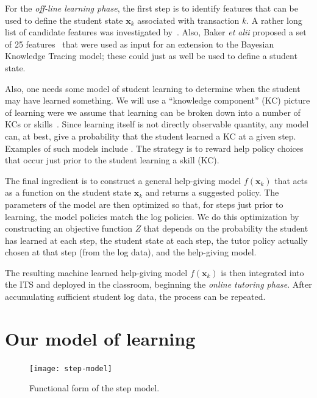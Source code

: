 \documentclass{edm_template}
\begin{document}
For the {\em off-line learning phase}, the first step is to identify
features that can be used to define the student state $\mathbf{x}_k$
associated with transaction $k$.  A rather
long list of candidate features was investigated
by~\cite{chi_micro-level_2009}.  Also, Baker {\em et alii} proposed
a set of 25 features~\citeyear{baker_more_2008} that were used as input 
for an extension to the Bayesian Knowledge Tracing model;  these
could just as well be used to define a student state.

Also, one needs some model of student learning to determine when the
student may have learned something.  We will use a ``knowledge
component'' (KC) picture of learning were we assume that learning can be
broken down into a number of KCs or skills~\cite{vanlehn_behavior_2006}.  
Since learning itself is not directly observable quantity, any model
can, at best, give a probability that the student learned a KC at a
given step.  Examples of such models include
\cite{van_de_sande_measuring_2013,baker_detecting_2010}. 
The strategy is to reward help policy choices that occur just prior to
the student learning a skill (KC).

The final ingredient is to construct a general help-giving model $f(\mathbf{x}_k)$ that
acts as a function on the student state $\mathbf{x}_k$  and returns a suggested policy.
The parameters of the model are then optimized so that, for steps
just prior to learning, the model policies match the log policies.
We do this optimization by constructing an objective function $Z$ that
depends on the probability the student has learned at each step, the
student state at each step,  the tutor policy actually chosen at
that step (from the log data), and the help-giving model.

The resulting machine learned help-giving model $f(\mathbf{x}_k)$ is
then integrated into the  ITS and deployed in the classroom, beginning
the {\em online tutoring phase}.  After accumulating sufficient student log data,
the process can be repeated.


\section{Our model of learning}

\begin{figure}
\centering    \texttt{[image: step-model]}
  \caption{Functional form of the step model.}
         \label{stepf}
\end{figure}
\end{document}
